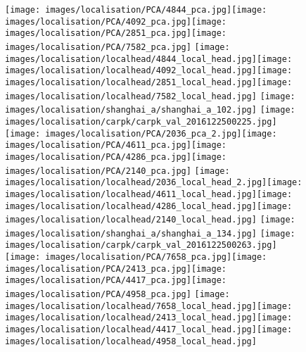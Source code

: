 \documentclass[letterpaper, 11pt]{IEEEtran}
\begin{document}
\begin{figure*}
    \centering
    \texttt{[image: images/localisation/PCA/4844\_pca.jpg]}\texttt{[image: images/localisation/PCA/4092\_pca.jpg]}\texttt{[image: images/localisation/PCA/2851\_pca.jpg]}\texttt{[image: images/localisation/PCA/7582\_pca.jpg]}
\texttt{[image: images/localisation/localhead/4844\_local\_head.jpg]}\texttt{[image: images/localisation/localhead/4092\_local\_head.jpg]}\texttt{[image: images/localisation/localhead/2851\_local\_head.jpg]}\texttt{[image: images/localisation/localhead/7582\_local\_head.jpg]}
\texttt{[image: images/localisation/shanghai\_a/shanghai\_a\_102.jpg]}
\texttt{[image: images/localisation/carpk/carpk\_val\_2016122500225.jpg]}\\\vspace{-0.1em}
\texttt{[image: images/localisation/PCA/2036\_pca\_2.jpg]}\texttt{[image: images/localisation/PCA/4611\_pca.jpg]}\texttt{[image: images/localisation/PCA/4286\_pca.jpg]}\texttt{[image: images/localisation/PCA/2140\_pca.jpg]}
\texttt{[image: images/localisation/localhead/2036\_local\_head\_2.jpg]}\texttt{[image: images/localisation/localhead/4611\_local\_head.jpg]}\texttt{[image: images/localisation/localhead/4286\_local\_head.jpg]}\texttt{[image: images/localisation/localhead/2140\_local\_head.jpg]}
\texttt{[image: images/localisation/shanghai\_a/shanghai\_a\_134.jpg]}
\texttt{[image: images/localisation/carpk/carpk\_val\_2016122500263.jpg]}\\\vspace{-0.1em}
\texttt{[image: images/localisation/PCA/7658\_pca.jpg]}\texttt{[image: images/localisation/PCA/2413\_pca.jpg]}\texttt{[image: images/localisation/PCA/4417\_pca.jpg]}\texttt{[image: images/localisation/PCA/4958\_pca.jpg]}
\texttt{[image: images/localisation/localhead/7658\_local\_head.jpg]}\texttt{[image: images/localisation/localhead/2413\_local\_head.jpg]}\texttt{[image: images/localisation/localhead/4417\_local\_head.jpg]}\texttt{[image: images/localisation/localhead/4958\_local\_head.jpg]}

\end{figure*}
\end{document}
